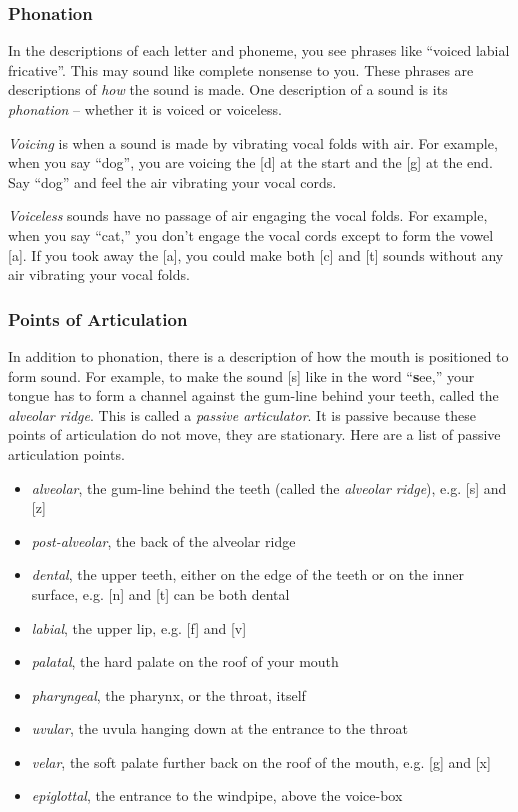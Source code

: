 \documentclass[12pt]{book}
\begin{document}
\subsubsection{Phonation}

In the descriptions of each letter and phoneme, you see phrases like ``voiced labial fricative''. This may sound like complete nonsense to you. These phrases are descriptions of \emph{how} the sound is made. One description of a sound is its \emph{phonation} -- whether it is voiced or voiceless. 

\emph{Voicing} is when a sound is made by vibrating vocal folds with air. For example, when you say ``dog'', you are voicing the [d] at the start and the [g] at the end. Say ``dog'' and feel the air vibrating your vocal cords. 

\emph{Voiceless} sounds have no passage of air engaging the vocal folds. For example, when you say ``cat,'' you don't engage the vocal cords except to form the vowel [a]. If you took away the [a], you could make both [c] and [t] sounds without any air vibrating your vocal folds.  

\subsubsection{Points of Articulation}

In addition to phonation, there is a description of how the mouth is positioned to form sound. For example, to make the sound [s] like in the word ``\textbf{s}ee,'' your tongue has to form a channel against the gum-line behind your teeth, called the \emph{alveolar ridge}. This is called a \emph{passive articulator}. It is passive because these points of articulation do not move, they are stationary. Here are a list of passive articulation points.

\begin{itemize}
	\item \emph{alveolar}, the gum-line behind the teeth (called the \textit{alveolar ridge}), e.g. [s] and [z]
	\item \emph{post-alveolar}, the back of the alveolar ridge
	\item \emph{dental}, the upper teeth, either on the edge of the teeth or on the inner surface, e.g. [n] and [t] can be both dental
	\item \emph{labial}, the upper lip, e.g. [f] and [v]
	\item \emph{palatal}, the hard palate on the roof of your mouth
	\item \emph{pharyngeal}, the pharynx, or the throat, itself
	\item \emph{uvular}, the uvula hanging down at the entrance to the throat
	\item \emph{velar}, the soft palate further back on the roof of the mouth, e.g. [g] and [x]
	\item \emph{epiglottal}, the entrance to the windpipe, above the voice-box  
\end{itemize}
\end{document}
